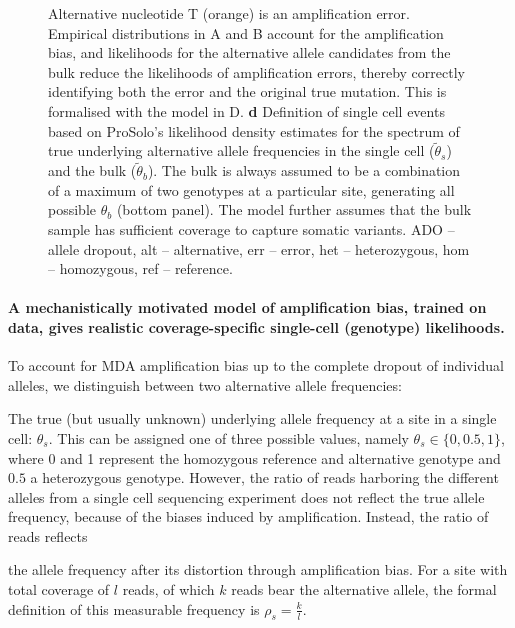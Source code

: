 \documentclass[12pt,inline]{wlscirep}
\begin{document}
\begin{figure}[!tpb]
{   Alternative nucleotide T (orange) is an amplification error.
   Empirical distributions in A and B account for the  amplification bias, and likelihoods for the alternative allele candidates from the bulk reduce the likelihoods of amplification errors, thereby correctly identifying both the error and the original true mutation.
   This is formalised with the model in D.
   \textbf{d} Definition of single cell events based on ProSolo's likelihood density estimates for the spectrum of true underlying alternative allele frequencies in the single cell ($\tilde{\theta}_s$) and the bulk ($\tilde{\theta}_b$).
   The bulk is always assumed to be a combination of a maximum of two genotypes at a particular site, generating all possible $\theta_b$ (bottom panel).
   The model further assumes that the bulk sample has sufficient coverage to capture somatic variants.\small\newline
   ADO -- allele dropout, alt -- alternative, err -- error, het -- heterozygous, hom -- homozygous, ref -- reference.}
  \label{fig:prosolo_alt-calling}
\end{figure}

\paragraph{A mechanistically motivated model of amplification bias, trained on data, gives realistic coverage-specific single-cell (genotype) likelihoods.}
To account for MDA amplification bias up to the complete dropout of individual alleles, we distinguish between two alternative allele frequencies:
\begin{enumerate*}[label={(\roman*)}]
  \item The true (but usually unknown) underlying allele frequency at a site in a single cell: $\theta_s$.
   This can be assigned one of three possible values, namely $\theta_s\in\{0,0.5,1\}$, where 0 and 1 represent the homozygous reference and alternative genotype and $0.5$ a heterozygous genotype.
   However, the ratio of reads harboring the different alleles from a single cell sequencing experiment does not reflect the true allele frequency, because of the biases induced by amplification. 
  Instead, the ratio of reads reflects
  \item the allele frequency after its distortion through amplification bias.
   For a site with total coverage of $l$ reads, of which $k$ reads bear the alternative allele, the formal definition of this measurable frequency is $\rho_s=\frac{k}{l}$.
\end{enumerate*}
\end{document}
